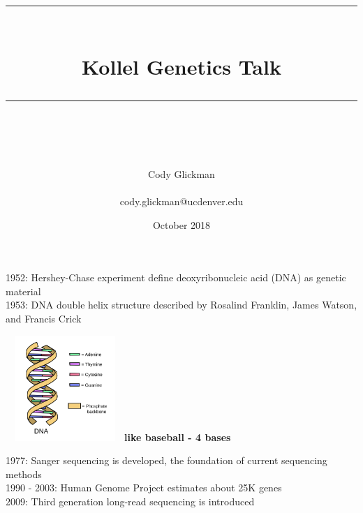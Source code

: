 \documentclass[hyperref,openany, oneside]{labbook} %
\newcommand{\HRule}{\rule{\linewidth}{0.5mm}} %
\begin{document}

\frontmatter %
\title{
\begin{center}
\HRule \\[0.4cm]
{\Huge \bfseries Kollel Genetics Talk \\[0.5cm] \Large} %
\HRule \\[1.5cm]
\end{center}
}
\author{\Huge Cody Glickman \\ \\ \LARGE cody.glickman@ucdenver.edu \\[2cm]} %
\date{October 2018} %


\mainmatter %


\vspace{-0.3cm}
1952: Hershey-Chase experiment define deoxyribonucleic acid (DNA) as genetic material \\
1953: DNA double helix structure described by Rosalind Franklin, James Watson, and Francis Crick
\vspace{-0.5cm}
\begin{center}
	\includegraphics[height=4cm, width=4.5cm]{dnastructure.png}{\textbf{like baseball - 4 bases}}
\end{center}
\vspace{-0.2cm}
1977: Sanger sequencing is developed, the foundation of current sequencing methods 
\\
1990 - 2003: Human Genome Project estimates about 25K genes 
\\
2009: Third generation long-read sequencing is introduced
\end{document}
